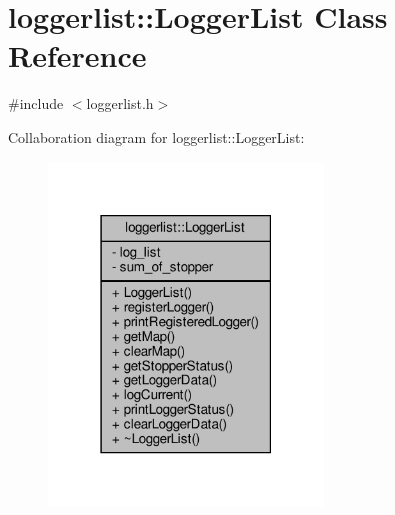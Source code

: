 \hypertarget{classloggerlist_1_1_logger_list}{}\section{loggerlist\+:\+:Logger\+List Class Reference}
\label{classloggerlist_1_1_logger_list}


{\ttfamily \#include $<$loggerlist.\+h$>$}



Collaboration diagram for loggerlist\+:\+:Logger\+List\+:
\nopagebreak
\begin{figure}[H]
\begin{center}
\leavevmode
\includegraphics[width=207pt]{classloggerlist_1_1_logger_list__coll__graph}
\end{center}
\end{figure}
